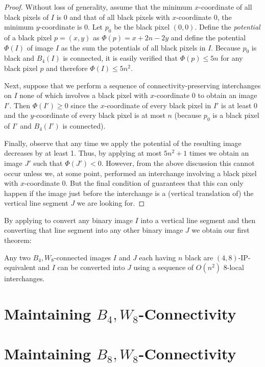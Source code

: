 \documentclass[lotsofwhite,charterfonts]{patmorin}
\begin{document}
\begin{proof} 
Without loss of generality, assume that the minimum $x$-coordinate of
all black pixels of $I$ is 0 and that of all black pixels with
$x$-coordinate 0, the minimum $y$-coordinate is 0.  Let $p_0$ be the
black pixel $(0,0)$. Define the \emph{potential} of a black pixel
$p=(x,y)$ as $\Phi(p)=x+2n-2y$ and define the potential $\Phi(I)$ of
image $I$ as the sum the potentials of all black pixels in $I$.
Because $p_0$ is black and $B_4(I)$ is connected, it is easily
verified that $\Phi(p)\le 5n$ for any black pixel $p$ and therefore
$\Phi(I)\le 5n^2$.

Next, suppose that we perform a sequence of connectivity-preserving
interchanges on $I$ none of which involves a black pixel with
$x$-coordinate 0 to obtain an image $I'$.  Then $\Phi(I')\ge 0$ since
the $x$-coordinate of every black pixel in $I'$ is at least 0 and the
$y$-coordinate of every black pixel is at most $n$ (because $p_0$ is a
black pixel of $I'$ and $B_4(I')$ is connected). 

Finally, observe that any time we apply  the
potential of the resulting image decreases by at least 1.  Thus, by
applying  at most $5n^2+1$ times we obtain an image
$J'$ such that $\Phi(J')< 0$.  However, from the above discussion this
cannot  occur unless we, at some point, performed an interchange
involving a black pixel with $x$-coordinate 0.  But the final
condition of  guarantees that this can only happen
if the image just before the interchange is a (vertical translation
of) the vertical line segment $J$ we are looking for.  \end{proof}

By applying  to convert any binary image $I$ into a
vertical line segment and then converting that line segment into any
other binary image $J$ we obtain our first theorem:

\begin{thm}
Any two $B_4,W_8$-connected images $I$ and $J$ each having $n$ black
are $(4,8)$-IP-equivalent and $I$ can be converted into $J$ using a
sequence of $O(n^2)$ 8-local interchanges.
\end{thm}


\section{Maintaining $B_4,W_8$-Connectivity}

\section{Maintaining $B_8,W_8$-Connectivity}
\end{document}
